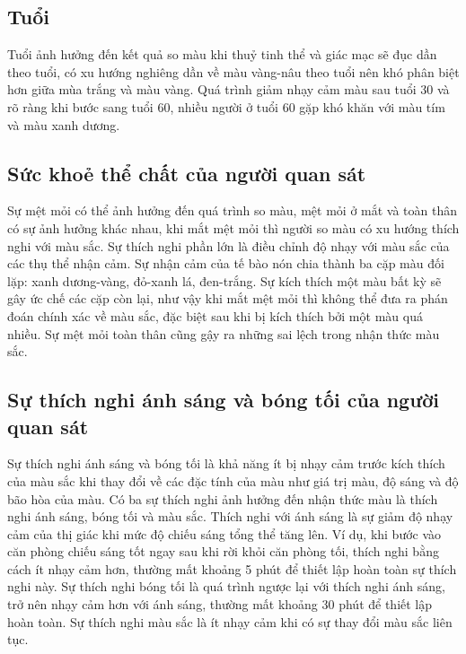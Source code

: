 \subsection{Tuổi}
\qquad Tuổi ảnh hưởng đến kết quả so màu khi thuỷ tinh thể và giác mạc sẽ đục dần theo tuổi, có xu hướng nghiêng dần về màu vàng-nâu theo tuổi nên khó phân biệt hơn giữa mùa trắng và màu vàng. Quá trình giảm nhạy cảm màu sau tuổi 30 và rõ ràng khi bước sang tuổi 60, nhiều người ở tuổi 60 gặp khó khăn với màu tím và màu xanh dương.\cite{TruongDinhKhoi}

\subsection{Sức khoẻ thể chất của người quan sát}
\qquad Sự mệt mỏi có thể ảnh hưởng đến quá trình so màu, mệt mỏi ở mắt và toàn thân có sự ảnh hưởng khác nhau, khi mắt mệt mỏi thì người so màu có xu hướng thích nghi với màu sắc. Sự thích nghi phần lớn là điều chỉnh độ nhạy với màu sắc của các thụ thể nhận cảm. Sự nhận cảm của tế bào nón chia thành ba cặp màu đối lặp: xanh dương-vàng, đỏ-xanh lá, đen-trắng. Sự kích thích một màu bất kỳ sẽ gây ức chế các cặp còn lại, như vậy khi mắt mệt mỏi thì không thể đưa ra phán đoán chính xác về màu sắc, đặc biệt sau khi bị kích thích bởi một màu quá nhiều. Sự mệt mỏi toàn thân cũng gậy ra những sai lệch trong nhận thức màu sắc.\cite{TruongDinhKhoi}

 \subsection{Sự thích nghi ánh sáng và bóng tối của người quan sát}
 \qquad Sự thích nghi ánh sáng và bóng tối là khả năng ít bị nhạy cảm trước kích thích của màu sắc khi thay đổi về các đặc tính của màu như giá trị màu, độ sáng và độ bão hòa của màu. Có ba sự thích nghi ảnh hưởng đến nhận thức màu là thích nghi ánh sáng, bóng tối và màu sắc. Thích nghi với ánh sáng là sự giảm độ nhạy cảm của thị giác khi mức độ chiếu sáng tổng thể tăng lên. Ví dụ, khi bước vào căn phòng chiếu sáng tốt ngay sau khi rời khỏi căn phòng tối, thích nghi bằng cách ít nhạy cảm hơn, thường mất khoảng 5 phút để thiết lập hoàn toàn sự thích nghi này. Sự thích nghi bóng tối là quá trình ngược lại với thích nghi ánh sáng, trở nên nhạy cảm hơn với ánh sáng, thường mất khoảng 30 phút để thiết lập hoàn toàn. Sự thích nghi màu sắc là ít nhạy cảm khi có sự thay đổi màu sắc liên tục.\cite{TruongDinhKhoi}

